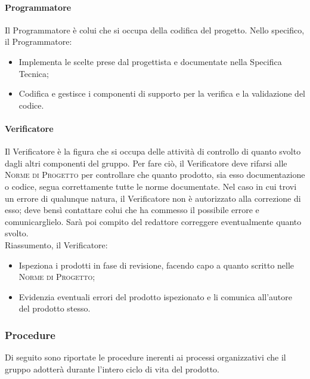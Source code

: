 \documentclass[../norme-di-progetto.tex]{subfiles}
\begin{document}
\paragraph{Programmatore}
Il Programmatore è colui che si occupa della codifica del progetto. Nello specifico, il Programmatore:
\begin{itemize}
  \item Implementa le scelte prese dal progettista e documentate nella Specifica Tecnica;
  \item Codifica e gestisce i componenti di supporto per la verifica e la validazione del codice.
\end{itemize}
\paragraph{Verificatore}
Il Verificatore è la figura che si occupa delle attività di controllo di quanto svolto dagli altri componenti del gruppo. Per fare ciò, il Verificatore deve rifarsi alle \textsc{Norme di Progetto} per controllare che quanto prodotto, sia esso documentazione o codice, segua correttamente tutte le norme documentate. Nel caso in cui trovi un errore di qualunque natura, il Verificatore non è autorizzato alla correzione di esso; deve bensì contattare colui che ha commesso il possibile errore e comunicarglielo. Sarà poi compito del redattore correggere eventualmente quanto svolto. \\
Riassumento, il Verificatore:
\begin{itemize}
  \item Ispeziona i prodotti in fase di revisione, facendo capo a quanto scritto nelle \textsc{Norme di Progetto};
  \item Evidenzia eventuali errori del prodotto ispezionato e li comunica all'autore del prodotto stesso.
\end{itemize}

\subsubsection{Procedure}
Di seguito sono riportate le procedure inerenti ai processi organizzativi che il gruppo adotterà durante l'intero ciclo di vita del prodotto.
\end{document}
